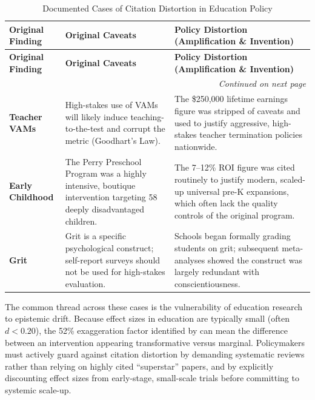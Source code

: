 \documentclass[12pt,letterpaper]{article}
\begin{document}
\begin{longtable}{p{3cm} p{4cm} p{8cm}}
\caption{Documented Cases of Citation Distortion in Education Policy} \\
\toprule
\textbf{Original Finding} & \textbf{Original Caveats} & \textbf{Policy Distortion (Amplification \& Invention)} \\
\midrule
\endfirsthead
\toprule
\textbf{Original Finding} & \textbf{Original Caveats} & \textbf{Policy Distortion (Amplification \& Invention)} \\
\midrule
\endhead
\midrule
\multicolumn{3}{r}{\textit{Continued on next page}} \\
\endfoot
\bottomrule
\endlastfoot
\textbf{Teacher VAMs} \newline \citep{chetty2014b} & High-stakes use of VAMs will likely induce teaching-to-the-test and corrupt the metric (Goodhart's Law). & The \$250,000 lifetime earnings figure was stripped of caveats and used to justify aggressive, high-stakes teacher termination policies nationwide. \\
\midrule
\textbf{Early Childhood} \newline \citep{heckman2010} & The Perry Preschool Program was a highly intensive, boutique intervention targeting 58 deeply disadvantaged children. & The 7--12\% ROI figure was cited routinely to justify modern, scaled-up universal pre-K expansions, which often lack the quality controls of the original program. \\
\midrule
\textbf{Grit} \newline \citep{duckworth2007} & Grit is a specific psychological construct; self-report surveys should not be used for high-stakes evaluation. & Schools began formally grading students on grit; subsequent meta-analyses \citep{cred2017} showed the construct was largely redundant with conscientiousness. \\
\end{longtable}

The common thread across these cases is the vulnerability of education research to epistemic drift. Because effect sizes in education are typically small (often $d < 0.20$), the 52\% exaggeration factor identified by \citet{sims2023} can mean the difference between an intervention appearing transformative versus marginal. Policymakers must actively guard against citation distortion by demanding systematic reviews rather than relying on highly cited ``superstar'' papers, and by explicitly discounting effect sizes from early-stage, small-scale trials before committing to systemic scale-up.
\end{document}
